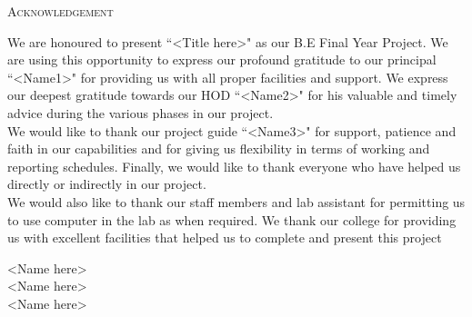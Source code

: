 \newpage
\thispagestyle{empty}

\begin{center}
    \Large \textsc {Acknowledgement}\\[0.5cm]
\end{center}

\normalsize We are honoured to present ``<Title here>" as our B.E Final Year Project.
We are using this opportunity to express our profound gratitude to our principal ``<Name1>" for providing us with all proper facilities and support.
We express our deepest gratitude towards our HOD ``<Name2>" for his valuable
and timely advice during the various phases in our project.
\\[0.5cm]
We would like to thank our project
guide ``<Name3>" for support, patience and faith in our capabilities and for giving
us flexibility in terms of working and reporting schedules. Finally, we would like to thank
everyone who have helped us directly or indirectly in our project.
\\[0.5cm]
We would also like to thank our staff members and lab assistant for permitting us to use
computer in the lab as when required. We thank our college for providing us with excellent
facilities that helped us to complete and present this project

\vspace{.8in}

\begin{flushleft}
    <Name here>\\[0.5cm]
    <Name here>\\[0.5cm]
    <Name here>\\[0.5cm]
\end{flushleft}
